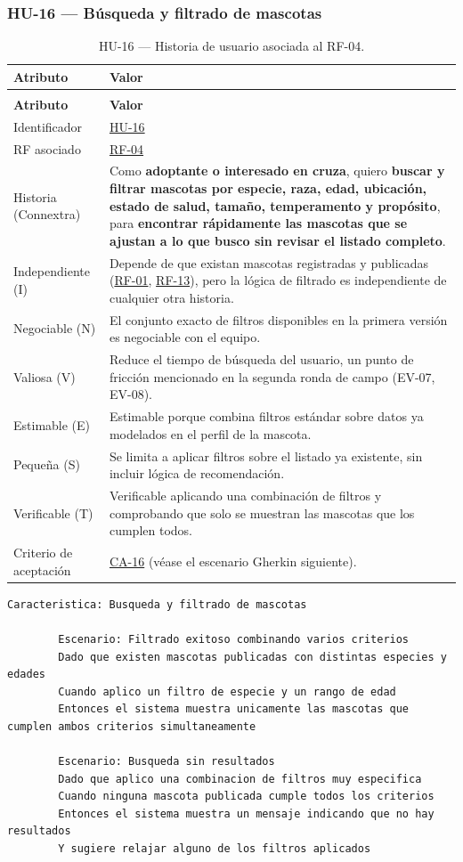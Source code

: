 \documentclass[journal,onecolumn]{IEEEtran}
\makeatletter
\newenvironment{atributos}[2]{%
	\small
	\begin{longtable}{@{}>{\raggedright\arraybackslash}p{4.2cm} >{\raggedright\arraybackslash}p{11.2cm}@{}}
		\caption{#2}\label{tab:#1}\\
		\toprule
		\textbf{Atributo} & \textbf{Valor} \\
		\midrule
		\endfirsthead
		\multicolumn{2}{@{}l}{\small\itshape (continuación)}\\
		\toprule
		\textbf{Atributo} & \textbf{Valor} \\
		\midrule
		\endhead
		\bottomrule
		\endlastfoot
	}{%
	\end{longtable}
	\normalsize
}
\makeatother
\begin{document}
	\subsubsection{HU-16 --- Búsqueda y filtrado de mascotas}
	
	\begin{atributos}{HU-16}{HU-16 --- Historia de usuario asociada al RF-04.}
		Identificador & \hyperref[tab:HU-16]{HU-16} \\
		RF asociado & \hyperref[tab:RF-04]{RF-04} \\
		Historia (Connextra) & Como \textbf{adoptante o interesado en cruza}, quiero \textbf{buscar y filtrar mascotas por especie, raza, edad, ubicación, estado de salud, tamaño, temperamento y propósito}, para \textbf{encontrar rápidamente las mascotas que se ajustan a lo que busco sin revisar el listado completo}. \\
		Independiente (I) & Depende de que existan mascotas registradas y publicadas (\hyperref[tab:RF-01]{RF-01}, \hyperref[tab:RF-13]{RF-13}), pero la lógica de filtrado es independiente de cualquier otra historia. \\
		Negociable (N) & El conjunto exacto de filtros disponibles en la primera versión es negociable con el equipo. \\
		Valiosa (V) & Reduce el tiempo de búsqueda del usuario, un punto de fricción mencionado en la segunda ronda de campo (EV-07, EV-08). \\
		Estimable (E) & Estimable porque combina filtros estándar sobre datos ya modelados en el perfil de la mascota. \\
		Pequeña (S) & Se limita a aplicar filtros sobre el listado ya existente, sin incluir lógica de recomendación. \\
		Verificable (T) & Verificable aplicando una combinación de filtros y comprobando que solo se muestran las mascotas que los cumplen todos. \\
		Criterio de aceptación & \hyperref[lst:ca16]{CA-16} (véase el escenario Gherkin siguiente). \\
	\end{atributos}
	
	\begin{lstlisting}[style=gherkin,caption={CA-16 --- Escenario de aceptación de la historia HU-16.},label={lst:ca16}]
		Caracteristica: Busqueda y filtrado de mascotas
		
		Escenario: Filtrado exitoso combinando varios criterios
		Dado que existen mascotas publicadas con distintas especies y edades
		Cuando aplico un filtro de especie y un rango de edad
		Entonces el sistema muestra unicamente las mascotas que cumplen ambos criterios simultaneamente
		
		Escenario: Busqueda sin resultados
		Dado que aplico una combinacion de filtros muy especifica
		Cuando ninguna mascota publicada cumple todos los criterios
		Entonces el sistema muestra un mensaje indicando que no hay resultados
		Y sugiere relajar alguno de los filtros aplicados
	\end{lstlisting}
	
\end{document}
